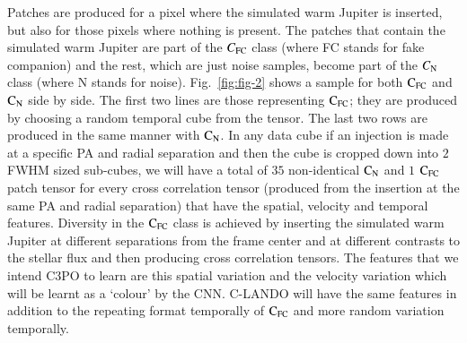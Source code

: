 \documentclass{aa}
\begin{document}
Patches are produced for a pixel where the simulated warm Jupiter is inserted, but also for those pixels where nothing is present.
The patches that contain the simulated warm Jupiter are part of the $C_{\rm{FC}}$ class (where FC stands for fake companion) and the rest, which are just noise samples, become part of the $C_{\rm{N}}$ class (where N stands for noise).
Fig.~\ref{fig:fig-2} shows a sample for both $\rm{C_{FC}}$ and $\rm{C_N}$ side by side.
The first two lines are those representing $\rm{C_{FC}}$; they are produced by choosing a random temporal cube from the tensor.
The last two rows are produced in the same manner with $\rm{C_N}$.
In any data cube if an injection is made at a specific PA and radial separation and then the cube is cropped down into $2$ FWHM sized sub-cubes, we will have a total of $35$ non-identical $\rm{C_N}$ and $1$ $\rm{C_{FC}}$ patch tensor for every cross correlation tensor (produced from the insertion at the same PA and radial separation) that have the spatial, velocity and temporal features. 
Diversity in the $\rm{C_{FC}}$ class is achieved by inserting the simulated warm Jupiter at different separations from the frame center and at different contrasts to the stellar flux and then producing cross correlation tensors.
The features that we intend C3PO to learn are this spatial variation and the velocity variation which will be learnt as a ‘colour’ by the CNN. 
C-LANDO will have the same features in addition to the repeating format temporally of $\rm{C_{FC}}$ and more random variation temporally.
\end{document}
